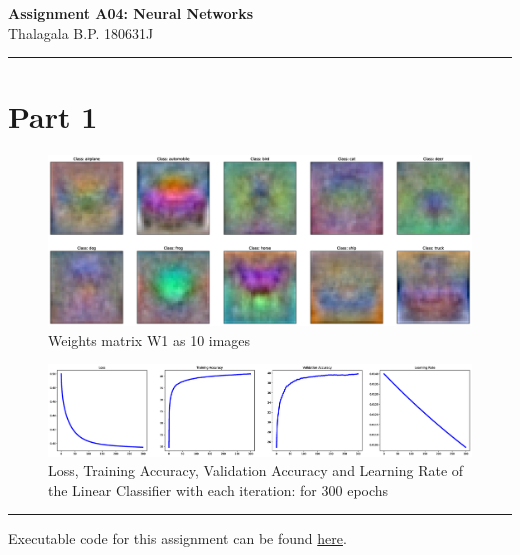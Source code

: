 \documentclass[a4paper,11pt]{article}%
\begin{document}
	\begin{center}
		{\large \textbf{Assignment A04: Neural Networks}}\\
		Thalagala B.P.\hspace{0.5cm} 180631J 
	\end{center}
	\hrule

\section{Part 1}

\begin{figure}[!h]
	\centering
	\includegraphics[scale=0.3]{figures/trainedWeights}
	\caption{Weights matrix W1 as 10 images}
\end{figure}

\begin{figure}[!h]
	\centering
	\includegraphics[scale=0.25]{figures/part1plots}
	\caption{Loss, Training Accuracy, Validation Accuracy and Learning Rate of the Linear Classifier with each iteration: for 300 epochs}
\end{figure}

\vfill
\hrule
\begin{center}
	Executable code for this assignment can be found  \href{https://github.com/bimalka98/Computer-Vision-and-Image-Processing/blob/main/EN2550Assignments/A4/180631J_a04.ipynb}{here}.
\end{center}
  
\end{document}
